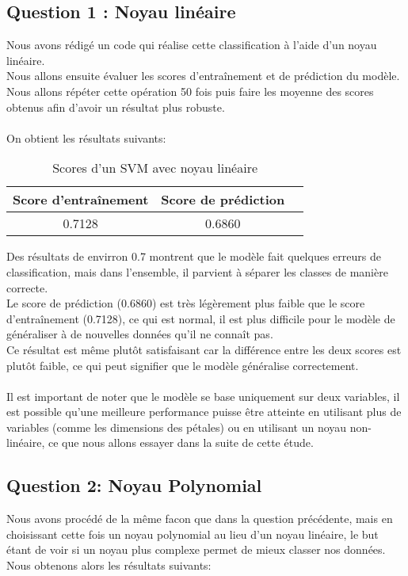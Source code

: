 \documentclass{article}
\begin{document}
\subsection{Question 1 : Noyau linéaire}

Nous avons rédigé un code qui réalise cette classification à l'aide d'un noyau linéaire.
\\ Nous allons ensuite évaluer les scores d'entraînement et de prédiction du modèle.
Nous allons répéter cette opération 50 fois puis faire les moyenne des scores obtenus afin d'avoir un résultat plus robuste.
\\
\\ On obtient les résultats suivants:

\begin{table}[h]
    \centering
    \begin{tabular}{|c|c|c|}
       \hline  Score d'entraînement & Score de prédiction \\
       \hline  0.7128 & 0.6860\\
       \hline
    \end{tabular}
    \caption{Scores d'un SVM avec noyau linéaire}
    \label{tab:my_label}
\end{table}


 Des résultats de envirron 0.7 montrent que le modèle fait quelques erreurs de classification, mais dans l'ensemble, il parvient à séparer les classes de manière correcte. 
\\ Le score de prédiction (0.6860) est très légèrement plus faible que le score d'entraînement (0.7128), ce qui est normal, il est plus difficile pour le modèle de généraliser à de nouvelles données qu'il ne connaît pas. 
\\
Ce résultat est même plutôt satisfaisant car la différence entre les deux scores est plutôt faible, ce qui peut signifier que le modèle généralise correctement.
\\
\\
Il est important de noter que le modèle se base uniquement sur deux variables, il est possible qu'une meilleure performance puisse être atteinte en utilisant plus de variables (comme les dimensions des pétales) ou en utilisant un noyau non-linéaire, ce que nous allons essayer dans la suite de cette étude.

\newpage
\subsection{Question 2: Noyau Polynomial}
Nous avons procédé de la même facon que dans la question précédente, mais en choisissant cette fois un noyau polynomial au lieu d'un noyau linéaire, le but étant de voir si un noyau plus complexe permet de mieux classer nos données. 
\\Nous  obtenons alors les résultats suivants:
\end{document}
